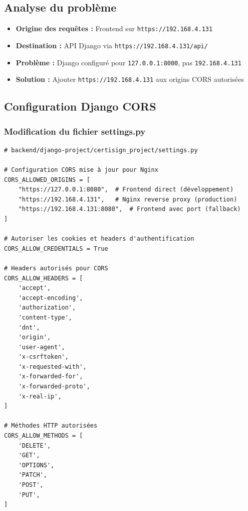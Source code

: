 \documentclass[12pt,a4paper]{article}
\begin{document}
\subsection{Analyse du problème}

\begin{itemize}[leftmargin=*]
    \item \textbf{Origine des requêtes :} Frontend sur \texttt{https://192.168.4.131}
    \item \textbf{Destination :} API Django via \texttt{https://192.168.4.131/api/}
    \item \textbf{Problème :} Django configuré pour \texttt{127.0.0.1:8000}, pas \texttt{192.168.4.131}
    \item \textbf{Solution :} Ajouter \texttt{https://192.168.4.131} aux origins CORS autorisées
\end{itemize}

\subsection{Configuration Django CORS}

\subsubsection{Modification du fichier settings.py}

\begin{lstlisting}[style=python, caption={Configuration CORS Django}, label={lst:django_cors}]
# backend/django-project/certisign_project/settings.py

# Configuration CORS mise à jour pour Nginx
CORS_ALLOWED_ORIGINS = [
    "https://127.0.0.1:8080",  # Frontend direct (développement)
    "https://192.168.4.131",   # Nginx reverse proxy (production)
    "https://192.168.4.131:8080",  # Frontend avec port (fallback)
]

# Autoriser les cookies et headers d'authentification
CORS_ALLOW_CREDENTIALS = True

# Headers autorisés pour CORS
CORS_ALLOW_HEADERS = [
    'accept',
    'accept-encoding',
    'authorization',
    'content-type',
    'dnt',
    'origin',
    'user-agent',
    'x-csrftoken',
    'x-requested-with',
    'x-forwarded-for',
    'x-forwarded-proto',
    'x-real-ip',
]

# Méthodes HTTP autorisées
CORS_ALLOW_METHODS = [
    'DELETE',
    'GET',
    'OPTIONS',
    'PATCH',
    'POST',
    'PUT',
]
\end{lstlisting}
\end{document}
